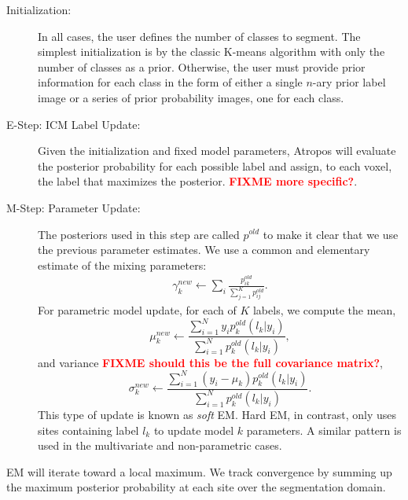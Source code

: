 \documentclass[11pt,english]{article}
\begin{document}
\begin{description}
\item[Initialization:] In all cases, the user defines the number of
classes to segment.  The simplest initialization is by the classic
K-means algorithm with only the number of classes as a prior.
Otherwise, the user must provide prior information for each class in
the form of either a single $n$-ary prior label image or a series of
prior probability images, one for each class.
\item[E-Step: ICM Label Update:] Given the initialization and fixed
model parameters, Atropos will evaluate the posterior probability for
each possible label and assign, to each voxel, the label that
maximizes the posterior.  {\bf \textcolor{red}{ FIXME more specific?}}.
\item[M-Step: Parameter Update:] 
The posteriors used in this step are called $p^{old}$ to make it
clear that we use the previous parameter estimates.
We use a common and elementary estimate of the mixing parameters:
\begin{align}
\gamma^{new}_k \leftarrow  \sum_i \frac{p^{old}_{ik}}{\sum_{j=1}^K p^{old}_{ij}}. 
\end{align}
For parametric model update, for each of
  $K$ labels, we compute the mean,
$$ \mu^{new}_k \leftarrow \frac{ \sum_{i=1}^N  y_i p^{old}_k(l_k|y_i)}{ \sum_{i=1}^N p^{old}_k(l_k|y_i) },
$$
and variance {\bf \textcolor{red}{ FIXME should this be the full
    covariance matrix?}},
$$ \sigma^{new}_k \leftarrow  \frac{ \sum_{i=1}^N  (y_i - \mu_k ) p^{old}_k(l_k|y_i)}{ \sum_{i=1}^N p^{old}_k(l_k|y_i) }.
$$
This type of update is known as {\em soft} EM.  Hard EM, in
contrast, only uses sites containing label $l_k$ to update model $k$ parameters.
A similar pattern is used in the multivariate and non-parametric cases.
\end{description}
EM will iterate toward a local maximum.  We track
convergence by summing up the maximum posterior
probability at each site over the segmentation domain.  
%
%
\end{document}
